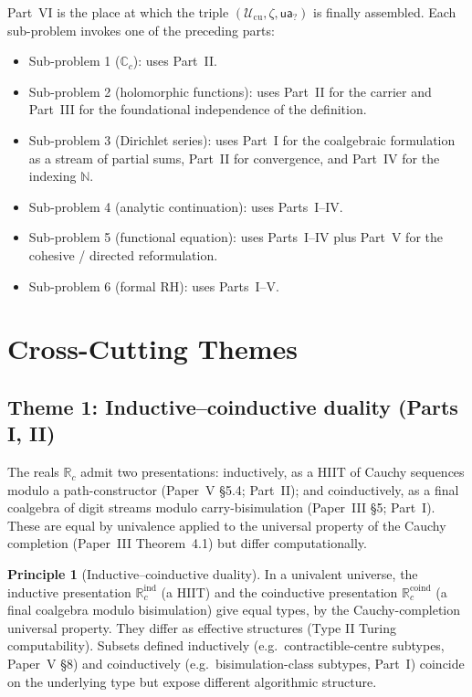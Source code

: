 \documentclass[12pt]{article}
\theoremstyle{definition}
\newtheorem{principle}[theorem]{Principle}
\theoremstyle{remark}
\newcommand{\Type}{\mathcal{U}}
\newcommand{\N}{\mathbb{N}}
\newcommand{\R}{\mathbb{R}}
\newcommand{\C}{\mathbb{C}}
\newcommand{\Rc}{\R_{c}}
\newcommand{\Cc}{\C_{c}}
\newcommand{\ua}{\mathsf{ua}}
\begin{document}
Part~VI is the place at which the triple $(\Type_{\mathrm{cu}}, \zeta, \ua_?)$
is finally assembled. Each sub-problem invokes one of the preceding
parts:
\begin{itemize}
\item Sub-problem 1 ($\Cc$): uses Part~II.
\item Sub-problem 2 (holomorphic functions): uses Part~II for the carrier
      and Part~III for the foundational independence of the definition.
\item Sub-problem 3 (Dirichlet series): uses Part~I for the coalgebraic
      formulation as a stream of partial sums, Part~II for convergence,
      and Part~IV for the indexing $\N$.
\item Sub-problem 4 (analytic continuation): uses Parts~I--IV.
\item Sub-problem 5 (functional equation): uses Parts~I--IV plus Part~V
      for the cohesive / directed reformulation.
\item Sub-problem 6 (formal RH): uses Parts~I--V.
\end{itemize}

\section{Cross-Cutting Themes}\label{sec:themes}

\subsection{Theme 1: Inductive--coinductive duality (Parts I, II)}

The reals $\Rc$ admit two presentations: inductively, as a HIIT of Cauchy
sequences modulo a path-constructor (Paper~V \S 5.4; Part~II); and
coinductively, as a final coalgebra of digit streams modulo
carry-bisimulation (Paper~III \S 5; Part~I). These are equal by
univalence applied to the universal property of the Cauchy completion
(Paper~III Theorem~4.1) but differ computationally.

\begin{principle}[Inductive--coinductive duality]\label{prin:dual}
In a univalent universe, the inductive presentation $\Rc^{\mathrm{ind}}$
(a HIIT) and the coinductive presentation $\Rc^{\mathrm{coind}}$ (a final
coalgebra modulo bisimulation) give equal types, by the Cauchy-completion
universal property. They differ as effective structures (Type II Turing
computability). Subsets defined inductively (e.g.\ contractible-centre
subtypes, Paper~V \S 8) and coinductively (e.g.\ bisimulation-class
subtypes, Part~I) coincide on the underlying type but expose different
algorithmic structure.
\end{principle}
\end{document}
